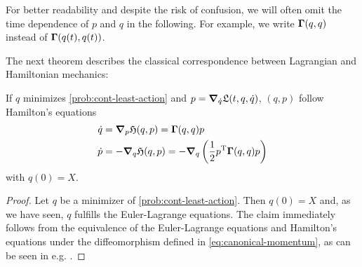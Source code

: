 For better readability and despite the risk of confusion, we will often omit the time dependence of $p$ and $q$ in the following.
For example, we write $\mathbf{\Gamma}(q, q)$ instead of $\mathbf{\Gamma}(q(t), q(t))$.

The next theorem describes the classical correspondence between Lagrangian and Hamiltonian mechanics:
\begin{theorem}
	\label{theo:hamiltonian-dynamic}
	If $q$ minimizes \cref{prob:cont-least-action} and $p = \grad_{\dot{q}} \mathfrak{L}(t, q, \dot{q})$, $(q, p)$ follow Hamilton's equations
	\begin{equation}
	\label{eq:hamiltonian-system}
		\begin{split}
			\dot{q} &= \grad_p \mathfrak{H}(q, p) = \mathbf{\Gamma}(q, q) p\\
			\dot{p} &= -\grad_q \mathfrak{H}(q, p)
			= -\grad_q \left(\frac{1}{2} p^\mathrm{T} \mathbf{\Gamma}(q, q) p\right)
		\end{split}
	\end{equation}
	with $q(0) = X$.
\end{theorem}
\begin{proof}
	Let $q$ be a minimizer of \cref{prob:cont-least-action}.
	Then $q(0) = X$ and, as we have seen, $q$ fulfills the Euler-Lagrange equations.
	The claim immediately follows from the equivalence of the Euler-Lagrange equations and Hamilton's equations under the diffeomorphism defined in \cref{eq:canonical-momentum}, as can be seen in e.g. \cite{marsden10, goldstein01}.
\end{proof}

